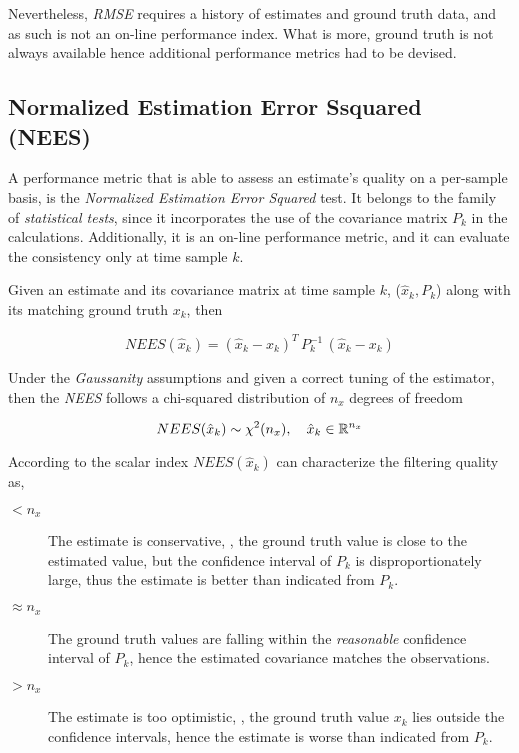 Nevertheless, \emph{RMSE} requires a history of estimates and ground truth data, and as such is not an on-line performance index. What is more,  ground truth is not always available hence additional performance metrics had to be devised. 

\subsection{Normalized Estimation Error Ssquared (NEES)}
\label{ssec:NEES}
A performance metric that is able to assess an estimate's quality on a per-sample basis, is the \emph{Normalized Estimation Error Squared} test. It belongs to the family of \emph{statistical tests}, since it incorporates the use of the covariance matrix $P_k$ in the calculations. Additionally, it is an on-line performance metric, and it can evaluate the consistency only at time sample $k$.

\begin{framed}
Given an estimate and its covariance matrix at time sample $k$, ($\hat{x}_k, P_k$) along with its matching ground truth $x_k$, then

\begin{equation}\label{eq:NEES}
NEES(\hat{x}_k) =  (\hat{x}_k - x_k)^T \, P_k^{-1} \, (\hat{x}_k - x_k) 
\end{equation}

\end{framed}

Under the \emph{Gaussanity} assumptions and given a correct tuning of the estimator, then the \emph{NEES} follows a chi-squared distribution of $n_x$  degrees of freedom

\begin{equation}\label{key}
NEES(\hat{x}_k) \sim \chi^2(n_x), \quad \hat{x}_k \in {\mathbb{R}}^{n_x}
\end{equation}

According to \cite{TargetTracking} the scalar index $NEES(\hat{x}_k)$ can characterize the filtering quality as,

\begin{description}
	\item[$< n_x$] The estimate is conservative, \ie, the ground truth value is close to the estimated value, but the confidence interval of $P_k$ is disproportionately large, thus the estimate is better than indicated from $P_k$.
	\item[$ \approx n_x $] The ground truth values are falling within the \emph{reasonable} confidence interval of $P_k$, hence the estimated covariance matches the observations.
	\item[$> n_x$] The estimate is too optimistic, \ie, the ground truth value $x_k$ lies outside the confidence intervals, hence the estimate is worse than indicated from $P_k$.
\end{description}

